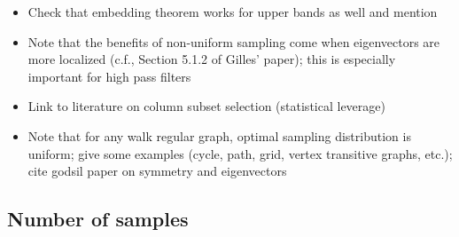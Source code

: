 \documentclass[journal, 10pt]{IEEEtran}
\begin{document}



{\color{red}
\begin{itemize}
\item Check that embedding theorem works for upper bands as well and mention
\item Note that the benefits of non-uniform sampling come when eigenvectors are more localized (c.f., Section 5.1.2 of Gilles' paper); this is especially important for high pass filters
\item Link to literature on column subset selection (statistical leverage)
\item Note that for any walk regular graph, optimal sampling distribution is uniform; give some examples (cycle, path, grid, vertex transitive graphs, etc.); cite godsil paper on symmetry and eigenvectors
\end{itemize}
}

\subsection{Number of samples}
\end{document}
